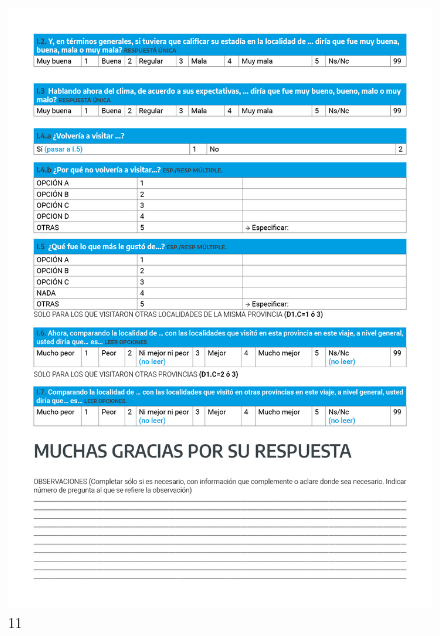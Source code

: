 \documentclass[
]{book}
\begin{document}
\begin{figure}

{\centering \includegraphics[width=1\linewidth]{imagenes/graf011} 

}

\caption{11}\label{fig:011}
\end{figure}

  
\end{document}
